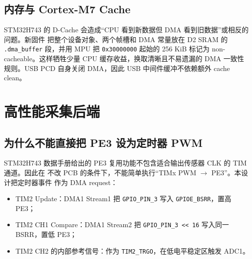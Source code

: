 \documentclass[UTF8,fontset=windows,11pt]{ctexart}
\newcommand{\code}[1]{\texttt{#1}}
\begin{document}
\subsection{内存与 Cortex-M7 Cache}

STM32H743 的 D-Cache 会造成“CPU 看到新数据但 DMA 看到旧数据”或相反的问题。新固件
把整个设备对象、两个帧槽和 DMA 常量放在 D2 SRAM 的 \code{.dma\_buffer} 段，并用
MPU 把 \code{0x30000000} 起始的 256 KiB 标记为 non-cacheable。这样牺牲少量 CPU
缓存收益，换取清晰且不易遗漏的 DMA 一致性规则。USB PCD 自身关闭 DMA，因此 USB
中间件缓冲不依赖额外 cache clean。

\section{高性能采集后端}

\subsection{为什么不能直接把 PE3 设为定时器 PWM}

STM32H743 数据手册给出的 PE3 复用功能不包含适合输出传感器 CLK 的 TIM 通道。因此在
不改 PCB 的条件下，不能简单执行“TIMx PWM $\rightarrow$ PE3”。本设计把定时器事件
作为 DMA request：
\begin{itemize}
  \item TIM2 Update：DMA1 Stream1 把 \code{GPIO\_PIN\_3} 写入
        \code{GPIOE\_BSRR}，置高 PE3；
  \item TIM2 CH1 Compare：DMA1 Stream2 把
        \code{GPIO\_PIN\_3 << 16} 写入同一 BSRR，置低 PE3；
  \item TIM2 CH2 的内部参考信号：作为 \code{TIM2\_TRGO}，在低电平稳定区触发 ADC1。
\end{itemize}
\end{document}
